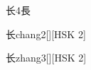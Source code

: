 \begin{entry}{长}{4}{⾧}
  \begin{phonetics}{长}{chang2}[][HSK 2]
  \end{phonetics}
  \begin{phonetics}{长}{zhang3}[][HSK 2]
  \end{phonetics}
\end{entry}
